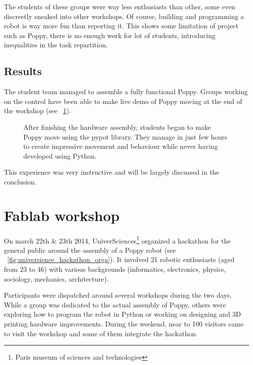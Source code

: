 The students of these groups were way less enthusiasts than other, some even discreetly sneaked into other workshops. Of course, building and programming a robot is way more fun than reporting it. This shows some limitation of project such as Poppy, there is no enough work for lot of students, introducing inequalities in the task repartition.

\subsection{Results} %

The student team managed to assemble a fully functional Poppy. Groups working on the control have been able to make live demo of Poppy moving at the end of the workshop (see \figurename~\ref{fig:saintonge_demonstration}).

\begin{figure}[tb]
\centering
    \hfil
    \caption{After finishing the hardware assembly, students began to make Poppy move using the pypot library. They manage in just few hours to create impressive movement and behaviour while never having developed using Python.}
    \label{fig:saintonge_demonstration}
\end{figure}

This experience was very instructive and will be largely discussed in the conclusion.


\section{Fablab workshop} %
\label{sec:poppy_universience}

On march 22th \& 23th 2014, UniverSciences\footnote{Paris museum of sciences and technologies} organized a hackathon for the general public around the assembly of a Poppy robot (see \figurename~\ref{fig:universience_hackathon_orga}).
It involved 21 robotic enthusiasts (aged from 23 to 46) with various backgrounds (informatics, electronics, physics, sociology, mechanics, architecture).

Participants were dispatched around several workshops during the two days. While a group was dedicated to the actual assembly of Poppy, others were exploring how to program the robot in Python or working on designing and 3D printing hardware improvements. During the weekend, near to 100 visitors came to visit the workshop and some of them integrate the hackathon.

